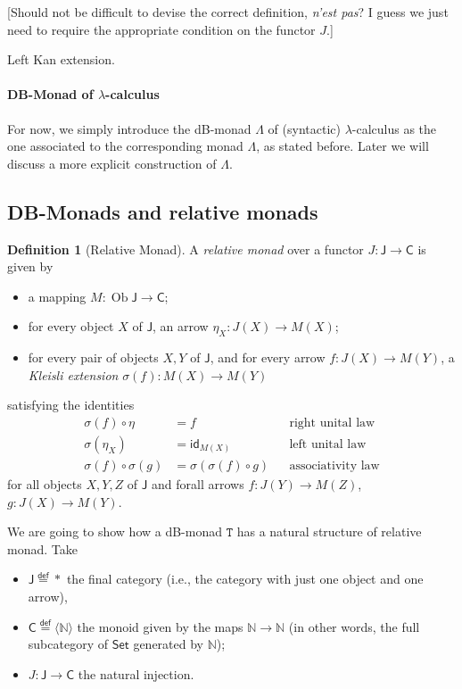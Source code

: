 \documentclass[a4paper,twoside,12pt]{article}
\theoremstyle{definition}
\newtheorem{definition}{Definition}
\theoremstyle{remark}
\DeclareMathOperator{\Ob}{Ob}
\newcommand{\NN}{\mathbb{N}}
\newcommand{\TT}{\mathtt{T}}
\begin{document}
[Should not be difficult to devise the correct definition, \emph{n'est
  pas}?  I guess we just need to require the appropriate condition on
the functor $J$.]

Left Kan extension.

\paragraph{DB-Monad of $\lambda$-calculus}

For now, we simply introduce the dB-monad $\mathsf{\Lambda}$ of
(syntactic) $\lambda$-calculus as the one associated to the
corresponding monad $\Lambda$, as stated before.  Later we will
discuss a more explicit construction of $\mathtt{\Lambda}$.

\subsection{DB-Monads and relative monads}
\label{sec:subst-rel-monads}

\begin{definition}[Relative Monad]
  A \emph{relative monad} over a functor $J\colon \mathsf{J}\to \mathsf{C}$
  is given by
  \begin{itemize}
  \item a mapping $M:\Ob \mathsf{J} \to \mathsf{C}$;
  \item for every object $X$ of $\mathsf{J}$, an arrow $\eta_X\colon
    J(X) \to M(X)$;
  \item for every pair of objects $X,Y$ of $\mathsf{J}$, and for every
    arrow $f\colon J(X) \to M(Y)$, a \emph{Kleisli extension}
    $\sigma(f) \colon M(X) \to M(Y)$
  \end{itemize}
  satisfying the identities
  \begin{align*}
    \sigma(f) \circ \eta &= f &&\text{right unital law} \\
    \sigma(\eta_X) &= \mathsf{id}_{M(X)} &&\text{left unital law} \\
    \sigma(f) \circ \sigma(g) &= \sigma(\sigma(f) \circ g) &&\text{associativity law}
  \end{align*}
  for all objects $X,Y,Z$ of $\mathsf{J}$ and forall arrows
  $f\colon J(Y)\to M(Z)$, $g\colon J(X)\to M(Y)$.
\end{definition}

We are going to show how a dB-monad $\TT$ has a natural structure of
relative monad.  Take
\begin{itemize}
\item $\mathsf{J}\stackrel{\mathsf{def}}{=}*$ the final category
  (i.e., the category with just one object and one arrow),
\item $\mathsf{C}\stackrel{\mathsf{def}}{=}\langle\NN\rangle$ the
  monoid given by the maps $\NN\to\NN$ (in other words, the full
  subcategory of $\mathsf{Set}$ generated by $\NN$);
\item $J\colon \mathsf{J} \to \mathsf{C}$ the natural injection.
\end{itemize}
\end{document}
